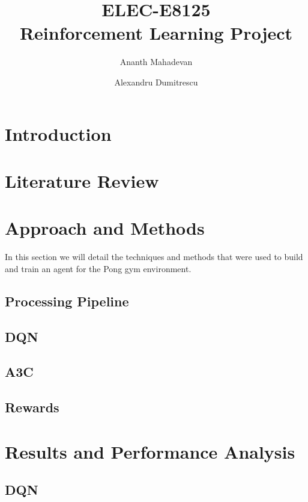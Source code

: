 \documentclass{article}
\title{ELEC-E8125 \\
        Reinforcement Learning Project}
\author{  Ananth Mahadevan\\
\and
Alexandru Dumitrescu\\
}
\date{}
\begin{document}
\maketitle
\clearpage
\tableofcontents
\clearpage

\section{Introduction}
\label{sec:introduction}



\section{Literature Review}
\label{sec:external}


\section{Approach and Methods}
\label{sec:methods}
In this section we will detail the techniques and methods that were used to build and train an agent for the Pong gym environment.

\subsection{Processing Pipeline}
\label{subsec:processing}


\subsection{DQN}
\label{sec:dqn-method}


\subsection{A3C}
\label{sec:a3c-method}


\subsection{Rewards}


\section{Results and Performance Analysis}
\label{sec:results}

\subsection{DQN}

\end{document}
